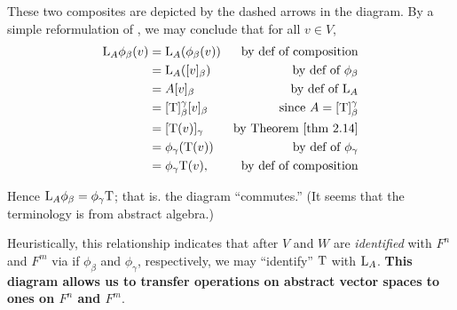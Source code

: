 These two composites are depicted by the dashed arrows in the diagram.
By a simple reformulation of , we may conclude that for all \(v \in V\),
\begin{align*}
    \LMTRAN_A \phi_{\beta}(v)
    & = \LMTRAN_A (\phi_{\beta}(v)) & \text{by def of composition} \\
    & = \LMTRAN_A([v]_{\beta}) & \text{by def of \(\phi_{\beta}\)} \\
    & = A [v]_{\beta} & \text{by def of \(\LMTRAN_A\)} \\
    & = [\T]_{\beta}^{\gamma} [v]_{\beta} & \text{since \(A = [\T]_{\beta}^{\gamma}\)} \\
    & = [\T(v)]_{\gamma} & \text{by \THM{2.14}} \\
    & = \phi_{\gamma}(\T(v)) & \text{by def of \(\phi_{\gamma}\)} \\
    & = \phi_{\gamma} \T (v), & \text{by def of composition}
\end{align*}

Hence \(\mathrm{L}_A \phi_{\beta} = \phi_{\gamma} \mathrm{T}\);
that is. the diagram ``commutes.'' (It seems that the terminology is from abstract algebra.)

Heuristically, this relationship indicates that after \(V\) and \(W\) are \emph{identified} with \(F^n\) and \(F^m\) via if \(\phi_{\beta}\) and \(\phi_{\gamma}\), respectively,
we may ``identify'' \(\mathrm{T}\) with \(\mathrm{L}_A\).
\textbf{This diagram allows us to transfer operations on abstract vector spaces to ones on \(F^n\) and \(F^m\)}.

